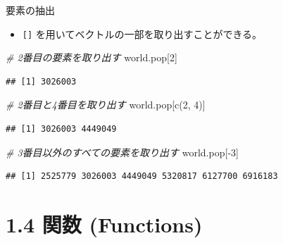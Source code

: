\documentclass[
  ignorenonframetext,
]{beamer}
\newenvironment{Shaded}{\begin{snugshade}}{\end{snugshade}}
\newcommand{\CommentTok}[1]{\textcolor[rgb]{0.56,0.35,0.01}{\textit{#1}}}
\newcommand{\DecValTok}[1]{\textcolor[rgb]{0.00,0.00,0.81}{#1}}
\newcommand{\FunctionTok}[1]{\textcolor[rgb]{0.00,0.00,0.00}{#1}}
\newcommand{\NormalTok}[1]{#1}
\newcommand{\SpecialCharTok}[1]{\textcolor[rgb]{0.00,0.00,0.00}{#1}}
\providecommand{\tightlist}{%
  \setlength{\itemsep}{0pt}\setlength{\parskip}{0pt}}
\begin{document}
\begin{frame}[fragile]{要素の抽出}
\protect\hypertarget{ux8981ux7d20ux306eux62bdux51fa}{}
\begin{itemize}
\tightlist
\item
  \texttt{{[}{]}} を用いてベクトルの一部を取り出すことができる。
\end{itemize}

\begin{Shaded}
\begin{Highlighting}[]
\CommentTok{\# 2番目の要素を取り出す}
\NormalTok{world.pop[}\DecValTok{2}\NormalTok{]}
\end{Highlighting}
\end{Shaded}

\begin{verbatim}
## [1] 3026003
\end{verbatim}

\begin{Shaded}
\begin{Highlighting}[]
\CommentTok{\# 2番目と4番目を取り出す}
\NormalTok{world.pop[}\FunctionTok{c}\NormalTok{(}\DecValTok{2}\NormalTok{, }\DecValTok{4}\NormalTok{)]}
\end{Highlighting}
\end{Shaded}

\begin{verbatim}
## [1] 3026003 4449049
\end{verbatim}

\begin{Shaded}
\begin{Highlighting}[]
\CommentTok{\# 3番目以外のすべての要素を取り出す}
\NormalTok{world.pop[}\SpecialCharTok{{-}}\DecValTok{3}\NormalTok{]}
\end{Highlighting}
\end{Shaded}

\begin{verbatim}
## [1] 2525779 3026003 4449049 5320817 6127700 6916183
\end{verbatim}
\end{frame}

\hypertarget{ux95a2ux6570-functions}{%
\section{1.4 関数 (Functions)}\label{ux95a2ux6570-functions}}
\end{document}
